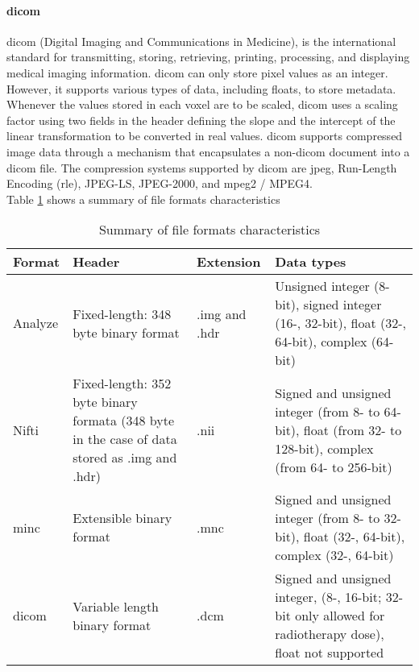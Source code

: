 \paragraph{\acs{dicom}}
\acs{dicom} (Digital Imaging and Communications in Medicine), is the international standard for transmitting, storing, retrieving, printing, processing, and displaying medical imaging information. \acs{dicom} can only store pixel values ​​as an integer. However, it supports various types of data, including floats, to store metadata. Whenever the values ​​stored in each voxel are to be scaled, \acs{dicom} uses a scaling factor using two fields in the header defining the slope and the intercept of the linear transformation to be converted in real values. \acs{dicom} supports compressed image data through a mechanism that encapsulates a non-\acs{dicom} document into a \acs{dicom} file. The compression systems supported by \acs{dicom} are \acs{jpeg}, Run-Length Encoding (\acs{rle}), JPEG-LS, JPEG-2000, and \acs{mpeg}2 / MPEG4.\cite{DIC:1,ME:1}\\
Table \ref{me-file-format} shows a summary of file formats characteristics
\begin{table}[h]
\begin{center}
\begin{tabular}{l p{5cm} l p{5cm}}
\hline
\textbf{Format} & \textbf{Header}                                                                              & \textbf{Extension} & \textbf{Data types}                                                                                     \\ \hline
Analyze & Fixed-length: 348 byte binary format& .img and .hdr & Unsigned integer (8-bit), signed integer (16-, 32-bit), float (32-, 64-bit), complex (64-bit)               \\ \hline
Nifti   & Fixed-length: 352 byte binary formata (348 byte in the case of data stored as .img and .hdr) & .nii& Signed and unsigned integer (from 8- to 64-bit), float (from 32- to 128-bit), complex (from 64- to 256-bit) \\ \hline
\acs{minc}    & Extensible binary format & .mnc& Signed and unsigned integer (from 8- to 32-bit), float (32-, 64-bit), complex (32-, 64-bit) \\ \hline
\acs{dicom}	& Variable length binary format	  & .dcm	       & Signed and unsigned integer, (8-, 16-bit; 32-bit only allowed for radiotherapy dose), float not supported
\end{tabular}
\caption{Summary of file formats characteristics \cite{ME:1}}
\label{me-file-format}
\end{center}
\end{table}
